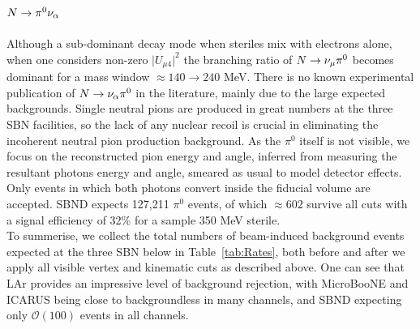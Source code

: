 \documentclass[11pt, a4paper]{article}
\newcommand{\reftab}[1]{Table~\ref{#1}}
\def\muboone{MicroBooNE}
\def\ster{\ensuremath N}
\begin{document}
\subsection{$\ster\rightarrow \pi^0 \nu_\alpha$}

Although a sub-dominant decay mode when steriles mix with electrons alone, when
one considers non-zero $\vert U_{\mu4}\vert^2$ the branching ratio of $\ster
\rightarrow \nu_\mu \pi^0$ becomes dominant for a mass window $\approx 140
\rightarrow 240$ MeV. There is no known experimental publication of $\ster
\rightarrow \nu_\alpha \pi^0$ in the literature, mainly due to the large
expected backgrounds. Single neutral pions are produced in great numbers at the
three SBN facilities, so the lack of any nuclear recoil is crucial in
eliminating the incoherent neutral pion production background. As the $\pi^0$
itself is not visible, we focus on the reconstructed pion energy and angle,
inferred from measuring the resultant photons energy and angle, smeared as
usual to model detector effects. Only events in which both photons convert
inside the fiducial volume are accepted. SBND expects 127,211 $\pi^0$ events,
of which $\approx 602$ survive all cuts with a signal efficiency of 32\% for a
sample 350 MeV sterile. \\ 

To summerise, we collect the total numbers of beam-induced background events
expected at the three SBN below in \reftab{tab:Rates}, both before and after we
apply all visible vertex and kinematic cuts as described above. One can see
that LAr provides an impressive level of background rejection, with \muboone
and ICARUS being close to backgroundless in many channels, and SBND expecting
only $\mathcal{O}(100)$ events in all channels.
\end{document}
